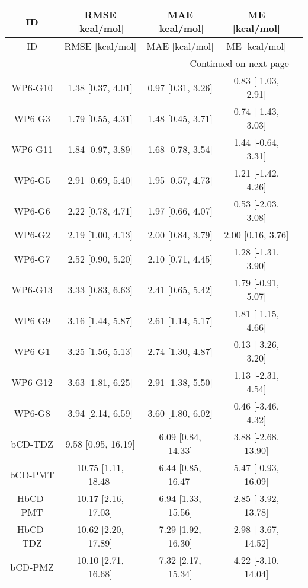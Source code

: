 \documentclass[8pt]{article}
\begin{document}
\begin{center}
\begin{footnotesize}
\begin{longtable}{|ccccc|}
\toprule
      ID &     RMSE [kcal/mol] &      MAE [kcal/mol] &       ME [kcal/mol] \\
\midrule
\endfirsthead

\toprule
      ID &     RMSE [kcal/mol] &      MAE [kcal/mol] &       ME [kcal/mol] \\
\midrule
\endhead
\midrule
\multicolumn{4}{r}{{Continued on next page}} \\
\midrule
\endfoot

\bottomrule
\endlastfoot
 WP6-G10 &   1.38 [0.37, 4.01] &   0.97 [0.31, 3.26] &  0.83 [-1.03, 2.91] \\
  WP6-G3 &   1.79 [0.55, 4.31] &   1.48 [0.45, 3.71] &  0.74 [-1.43, 3.03] \\
 WP6-G11 &   1.84 [0.97, 3.89] &   1.68 [0.78, 3.54] &  1.44 [-0.64, 3.31] \\
  WP6-G5 &   2.91 [0.69, 5.40] &   1.95 [0.57, 4.73] &  1.21 [-1.42, 4.26] \\
  WP6-G6 &   2.22 [0.78, 4.71] &   1.97 [0.66, 4.07] &  0.53 [-2.03, 3.08] \\
  WP6-G2 &   2.19 [1.00, 4.13] &   2.00 [0.84, 3.79] &   2.00 [0.16, 3.76] \\
  WP6-G7 &   2.52 [0.90, 5.20] &   2.10 [0.71, 4.45] &  1.28 [-1.31, 3.90] \\
 WP6-G13 &   3.33 [0.83, 6.63] &   2.41 [0.65, 5.42] &  1.79 [-0.91, 5.07] \\
  WP6-G9 &   3.16 [1.44, 5.87] &   2.61 [1.14, 5.17] &  1.81 [-1.15, 4.66] \\
  WP6-G1 &   3.25 [1.56, 5.13] &   2.74 [1.30, 4.87] &  0.13 [-3.26, 3.20] \\
 WP6-G12 &   3.63 [1.81, 6.25] &   2.91 [1.38, 5.50] &  1.13 [-2.31, 4.54] \\
  WP6-G8 &   3.94 [2.14, 6.59] &   3.60 [1.80, 6.02] &  0.46 [-3.46, 4.32] \\
 bCD-TDZ &  9.58 [0.95, 16.19] &  6.09 [0.84, 14.33] & 3.88 [-2.68, 13.90] \\
 bCD-PMT & 10.75 [1.11, 18.48] &  6.44 [0.85, 16.47] & 5.47 [-0.93, 16.09] \\
HbCD-PMT & 10.17 [2.16, 17.03] &  6.94 [1.33, 15.56] & 2.85 [-3.92, 13.78] \\
HbCD-TDZ & 10.62 [2.20, 17.89] &  7.29 [1.92, 16.30] & 2.98 [-3.67, 14.52] \\
 bCD-PMZ & 10.10 [2.71, 16.68] &  7.32 [2.17, 15.34] & 4.22 [-3.10, 14.04] \\

\end{longtable}
\end{footnotesize}
\end{center}
\end{document}
